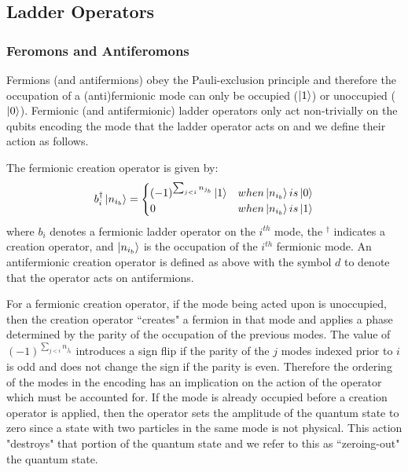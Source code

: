 \subsection{Ladder Operators}
\label{subsec:operators}

\subsubsection{Feromons and Antiferomons}


Fermions (and antifermions) obey the Pauli-exclusion principle  and therefore the occupation of a (anti)fermionic mode can only be occupied ($\ket{1}$) or unoccupied ($\ket{0}$).
Fermionic (and antifermionic) ladder operators only act non-trivially on the qubits encoding the mode that the ladder operator acts on and we define their action as follows.

The fermionic creation operator is given by:
\begin{equation}
    b_i^\dagger \ket{n_{i_b}} = 
    \begin{cases} 
        (-1)^{\sum_{j < i} n_{j_b}} \ket{1}  & when \ket{n_{i_b}} is \ket{0} \\
        0 & when \ket{n_{i_b}} is \ket{1}
    \end{cases}
\end{equation}
where $b_i$ denotes a fermionic ladder operator on the $i^{th}$ mode, the $^\dagger$ indicates a creation operator, and $\ket{n_{i_b}}$ is the occupation of the $i^{th}$ fermionic mode.
An antifermionic creation operator is defined as above with the symbol $d$ to denote that the operator acts on antifermions.

For a fermionic creation operator, if the mode being acted upon is unoccupied, then the creation operator ``creates" a fermion in that mode and applies a phase determined by the parity of the occupation of the previous modes.
The value of $(-1)^{\sum_{j < i} n_{j_b}}$ introduces a sign flip if the parity of the $j$ modes indexed prior to $i$ is odd and does not change the sign if the parity is even. 
Therefore the ordering of the modes in the encoding has an implication on the action of the operator which must be accounted for.
If the mode is already occupied before a creation operator is applied, then the operator sets the amplitude of the quantum state to zero since a state with two particles in the same mode is not physical.
This action "destroys" that portion of the quantum state and we refer to this as ``zeroing-out" the quantum state. 

